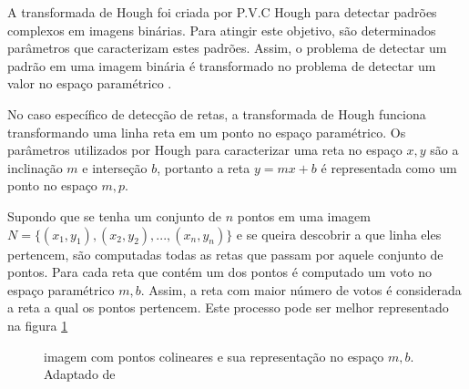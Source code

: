 A transformada de Hough foi criada por P.V.C Hough para detectar padrões complexos em imagens binárias. Para atingir este objetivo, são determinados parâmetros que caracterizam estes padrões. Assim, o problema de detectar um padrão em uma imagem binária é transformado no problema de detectar um valor no espaço paramétrico \cite{houghintro01}.


No caso específico de detecção de retas, a transformada de Hough funciona transformando uma linha reta em um ponto no espaço paramétrico. Os parâmetros utilizados por Hough para caracterizar uma reta no espaço $x,y$ são a inclinação $m$ e interseção $b$, portanto a reta $y = mx+b$ é representada como um ponto no espaço $m,p$.

Supondo que se tenha um conjunto de $n$ pontos em uma imagem $N = \{(x_1,y_1),(x_2,y_2),...,(x_n,y_n)\}$  e se queira descobrir a que linha eles pertencem, são computadas todas as retas que passam por aquele conjunto de pontos. Para cada reta que contém um dos pontos é computado um voto no espaço paramétrico $m,b$. Assim, a reta com maior número de votos é considerada a reta a qual os pontos pertencem. Este processo pode ser melhor representado na figura \ref{houghpuro}

\begin{figure}[h]
  \centering
  \hfill
  \caption{imagem com pontos colineares e sua representação no espaço $m,b$. Adaptado de \cite{houghintro01}}
  \label{houghpuro}
\end{figure}

